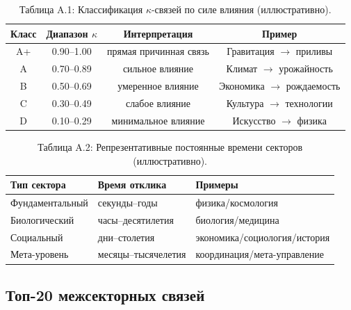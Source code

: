 \documentclass[11pt,a4paper]{article}
\begin{document}
	\begin{table}[htbp]
		\centering
		\small
		\begin{tabular}{cccc}
			\toprule
			\textbf{Класс} & \textbf{Диапазон $\kappa$} & \textbf{Интерпретация} & \textbf{Пример} \\
			\midrule
			A+ & 0.90--1.00 & прямая причинная связь & Гравитация $\rightarrow$ приливы \\
			A  & 0.70--0.89 & сильное влияние & Климат $\rightarrow$ урожайность \\
			B  & 0.50--0.69 & умеренное влияние & Экономика $\rightarrow$ рождаемость \\
			C  & 0.30--0.49 & слабое влияние & Культура $\rightarrow$ технологии \\
			D  & 0.10--0.29 & минимальное влияние & Искусство $\rightarrow$ физика \\
			\bottomrule
		\end{tabular}
		\caption{Таблица A.1: Классификация $\kappa$-связей по силе влияния (иллюстративно).}
	\end{table}
	
	\begin{table}[htbp]
		\centering
		\small
		\begin{tabular}{p{}p{}p{}}
			\toprule
			\textbf{Тип сектора} & \textbf{Время отклика} & \textbf{Примеры} \\
			\midrule
			Фундаментальный & секунды--годы & физика/космология \\
			Биологический & часы--десятилетия & биология/медицина \\
			Социальный & дни--столетия & экономика/социология/история \\
			Мета-уровень & месяцы--тысячелетия & координация/мета-управление \\
			\bottomrule
		\end{tabular}
		\caption{Таблица A.2: Репрезентативные постоянные времени секторов (иллюстративно).}
	\end{table}
	
	\subsection*{Топ-20 межсекторных связей}
	
\end{document}
